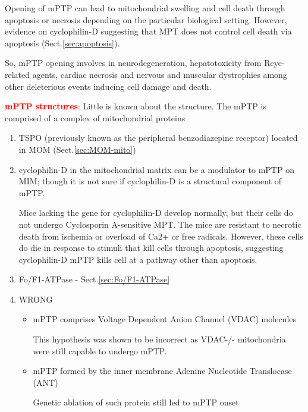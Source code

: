 Opening of mPTP can lead to mitochondrial swelling and cell death through
apoptosis or necrosis depending on the particular biological setting. However,
evidence on cyclophilin-D suggesting that MPT does not control cell death via
apoptosis (Sect.\ref{sec:apoptosis}).

So, mPTP opening involves in neurodegeneration, hepatotoxicity from Reye-related
agents, cardiac necrosis and nervous and muscular dystrophies among other
deleterious events inducing cell damage and death.

\textcolor{red}{\bf mPTP structures}: Little is known about the structure.
The mPTP is comprised of a complex of mitochondrial proteins
\begin{enumerate}
  \item  TSPO (previously known as the peripheral benzodiazepine receptor)
  located in MOM (Sect.\ref{sec:MOM-mito})

  \item  cyclophilin-D in the mitochondrial matrix can be a modulator to mPTP
  on MIM; though it is not sure if cyclophilin-D is a structural component of
  mPTP.

Mice lacking the gene for cyclophilin-D develop normally, but their cells do not
undergo Cyclosporin A-sensitive MPT. The mice are resistant to necrotic death
from ischemia or overload of Ca2+ or free radicals.
However, these cells do die in response to stimuli that kill cells through
apoptosis, suggesting cyclophilin-D mPTP kills cell at a pathway other than
apoptosis.

  \item Fo/F1-ATPase - Sect.\ref{sec:Fo/F1-ATPase}


  \item WRONG
  \begin{itemize}
    \item mPTP comprises Voltage Dependent Anion Channel (VDAC) molecules

This hypothesis was shown to be incorrect as VDAC-/- mitochondria were still
capable to undergo mPTP.

    \item mPTP formed by the inner membrane Adenine Nucleotide Translocase
    (ANT)

Genetic ablation of such protein still led to mPTP onset

  \end{itemize}
\end{enumerate}

